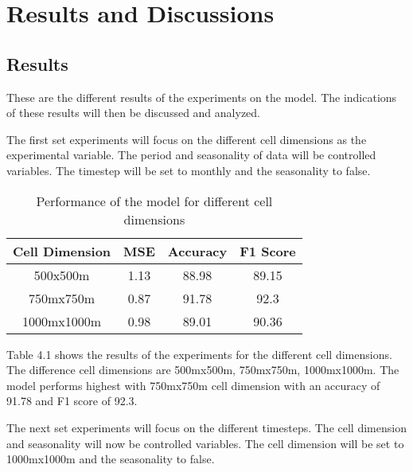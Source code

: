 
\chapter{Results and Discussions}  %

\section{Results}
    These are the different results of the experiments on the model. The indications of these results will then be discussed and analyzed.

    The first set experiments will focus on the different cell dimensions as the experimental variable. The period and seasonality of data will be controlled variables. The timestep will be set to monthly and the seasonality to false.

    \begin{table}[H]
      \centering
      \begin{tabular}{|c|c|c|c|}
            \hline
          \textbf{Cell Dimension}  &\textbf{MSE}  &\textbf{Accuracy} &\textbf{F1 Score}\\ 
          \hline
          500x500m &1.13 &88.98 &89.15 \\
          750mx750m &0.87 &91.78 &92.3 \\
          1000mx1000m  &0.98 &89.01 &90.36 \\
          \hline
        \end{tabular}
      \caption{Performance of the model for different cell dimensions}
    \end{table}
    Table 4.1 shows the results of the experiments for the different cell dimensions. The difference cell dimensions are 500mx500m, 750mx750m, 1000mx1000m. The model performs highest with 750mx750m cell dimension with an accuracy of 91.78 and F1 score of 92.3.

    The next set experiments will focus on the different timesteps. The cell dimension and seasonality will now be controlled variables. The cell dimension will be set to 1000mx1000m and the seasonality to false.

